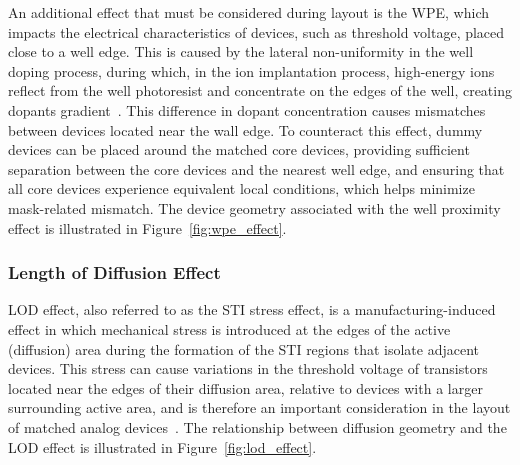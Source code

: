 An additional effect that must be considered during layout is the \ac{WPE}, which impacts the electrical characteristics of devices, such as threshold voltage, placed close to a well edge. This is caused by the lateral non-uniformity in the well doping process, during which, in the ion implantation process, high-energy ions reflect from the well photoresist and concentrate on the edges of the well, creating dopants gradient~\cite{razavi,layout_fundamentals}. This difference in dopant concentration causes mismatches between devices located near the wall edge. To counteract this effect, dummy devices can be placed around the matched core devices, providing sufficient separation between the core devices and the nearest well edge, and ensuring that all core devices experience equivalent local conditions, which helps minimize mask-related mismatch.
The device geometry associated with the well proximity effect is illustrated in Figure~\ref{fig:wpe_effect}.

\subsubsection{Length of Diffusion Effect}\label{sec:lod} %

\ac{LOD} effect, also referred to as the \ac{STI} stress effect, is a manufacturing-induced effect in which mechanical stress is introduced at the edges of the active (diffusion) area during the formation of the \ac{STI} regions that isolate adjacent devices. This stress can cause variations in the threshold voltage of transistors located near the edges of their diffusion area, relative to devices with a larger surrounding active area, and is therefore an important consideration in the layout of matched analog devices~\cite{razavi,layout_fundamentals}.
The relationship between diffusion geometry and the \ac{LOD} effect is illustrated in Figure~\ref{fig:lod_effect}.

